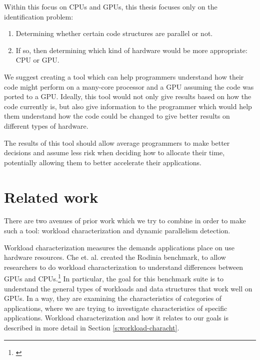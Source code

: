 \documentclass[12pt,twoside]{reedthesis}
\begin{document}
		
		Within this focus on CPUs and GPUs, this thesis focuses only on the identification problem: 
		
		\begin{enumerate}
			\item Determining whether certain code structures are parallel or not.
			\item If so, then determining which kind of hardware would be more appropriate: CPU or GPU. 
		\end{enumerate}
	
		We suggest creating a tool which can help programmers understand how their code might perform on a many-core processor and a GPU assuming the code was ported to a GPU. %
		Ideally, this tool would not only give results based on how the code currently is, but also give information to the programmer which would help them understand how the code could be changed to give better results on different types of hardware. 
		
		The results of this tool should allow average programmers to make better decisions and assume less risk when deciding how to allocate their time, potentially allowing them to better accelerate their applications. 
		
	\section{Related work}
	
		There are two avenues of prior work which we try to combine in order to make such a tool: workload characterization and dynamic parallelism detection. 
		
		Workload characterization measures the demands applications place on use hardware resources. Che et. al. created the Rodinia benchmark, to allow researchers to do workload characterization to understand differences between GPUs and CPUs.\footnote{\cite{Che:2010}} In particular, the goal for this benchmark suite is to understand the general types of workloads and data structures that work well on GPUs. In a way, they are examining the characteristics of categories of applications, where we are trying to investigate characteristics of specific applications. Workload characterization and how it relates to our goals is described in more detail in Section \ref{s:workload-characht}. 
		
\end{document}
